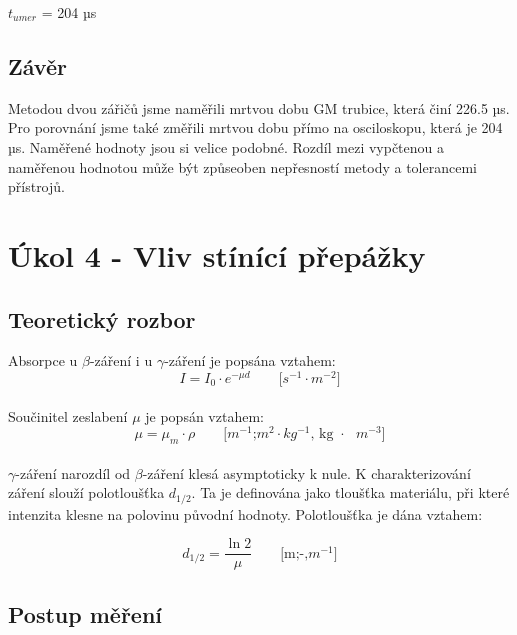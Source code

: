 \documentclass{protokol}
\begin{document}

    $t_{umer}$ = 204 µs
    


    \subsection{Závěr}

    Metodou dvou zářičů jsme naměřili mrtvou dobu GM trubice, která činí 226.5 µs. Pro porovnání jsme také změřili mrtvou dobu přímo na osciloskopu, která je 204 µs. Naměřené hodnoty jsou si velice podobné. Rozdíl mezi vypčtenou a naměřenou hodnotou může být způseoben nepřesností metody a tolerancemi přístrojů.

\pagebreak

\section{Úkol 4 - Vliv stínící přepážky}
    \subsection{Teoretický rozbor}

    Absorpce u $\beta$-záření i u $\gamma$-záření je popsána vztahem:
    \begin{equation}   
        I = I_0 \cdot e^{-\mu d}      \quad \quad    \text{[$s^{-1}$$\cdot$$m^{-2}$]}
    \end{equation}
    \\
    Součinitel zeslabení $\mu$ je popsán vztahem:
    \begin{equation}   
        \mu =  \mu_m \cdot \rho      \quad \quad    \text{[$m^{-1}$;$m^2$$\cdot$$kg^{-1}$, kg $\cdot$ $m^{-3}$]}
    \end{equation}
    \\
    $\gamma$-záření narozdíl od $\beta$-záření klesá asymptoticky k nule. K charakterizování záření slouží polotloušťka $d_{1/2}$. Ta je definována jako tloušťka materiálu, při které intenzita klesne na polovinu původní hodnoty. Polotloušťka je dána vztahem:

    \begin{equation}   
        d_{1/2} =  \dfrac{\ln{2}}{\mu}      \quad \quad    \text{[m;-,$m^{-1}$]}
    \end{equation}

    \subsection{Postup měření}
\end{document}
